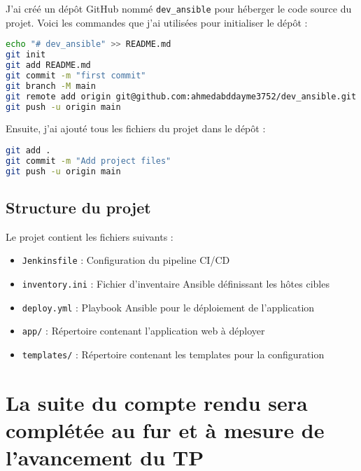 \documentclass{article}
\begin{document}
J'ai créé un dépôt GitHub nommé \texttt{dev\_ansible} pour héberger le code source du projet. Voici les commandes que j'ai utilisées pour initialiser le dépôt :

\begin{lstlisting}[language=bash]
echo "# dev_ansible" >> README.md
git init
git add README.md
git commit -m "first commit"
git branch -M main
git remote add origin git@github.com:ahmedabddayme3752/dev_ansible.git
git push -u origin main
\end{lstlisting}

Ensuite, j'ai ajouté tous les fichiers du projet dans le dépôt :

\begin{lstlisting}[language=bash]
git add .
git commit -m "Add project files"
git push -u origin main
\end{lstlisting}


\subsection{Structure du projet}
Le projet contient les fichiers suivants :
\begin{itemize}
    \item \texttt{Jenkinsfile} : Configuration du pipeline CI/CD
    \item \texttt{inventory.ini} : Fichier d'inventaire Ansible définissant les hôtes cibles
    \item \texttt{deploy.yml} : Playbook Ansible pour le déploiement de l'application
    \item \texttt{app/} : Répertoire contenant l'application web à déployer
    \item \texttt{templates/} : Répertoire contenant les templates pour la configuration
\end{itemize}

\section{La suite du compte rendu sera complétée au fur et à mesure de l'avancement du TP}

\end{document}
